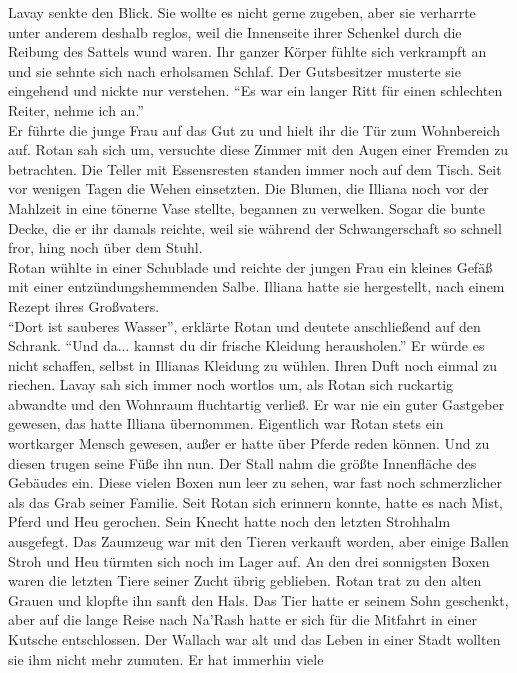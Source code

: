 Lavay senkte den Blick. Sie wollte es nicht gerne zugeben, aber sie verharrte unter anderem deshalb 
reglos, weil die Innenseite ihrer Schenkel durch die Reibung des Sattels wund waren. Ihr ganzer 
Körper fühlte sich verkrampft an und sie sehnte sich nach erholsamen Schlaf. Der Gutsbesitzer 
musterte sie eingehend und nickte nur verstehen. ``Es war ein langer Ritt für einen schlechten 
Reiter, nehme ich an.''\\
Er führte die junge Frau auf das Gut zu und hielt ihr die Tür zum Wohnbereich auf. Rotan sah sich 
um, versuchte diese Zimmer mit den Augen einer Fremden zu betrachten. Die Teller mit Essensresten 
standen immer noch auf dem Tisch. Seit vor wenigen Tagen die Wehen einsetzten. Die Blumen, die 
Illiana noch vor der Mahlzeit in eine tönerne Vase stellte, begannen zu verwelken. Sogar die bunte 
Decke, die er ihr damals reichte, weil sie während der Schwangerschaft so schnell fror, hing noch 
über dem Stuhl.\\
Rotan wühlte in einer Schublade und reichte der jungen Frau ein kleines Gefäß mit einer 
entzündungshemmenden Salbe. Illiana hatte sie hergestellt, nach einem Rezept ihres Großvaters.\\
``Dort ist sauberes Wasser'', erklärte Rotan und deutete anschließend auf den Schrank. ``Und da... 
kannst du dir frische Kleidung herausholen.'' Er würde es nicht schaffen, selbst in Illianas 
Kleidung zu wühlen. Ihren Duft noch einmal zu riechen. Lavay sah sich immer noch wortlos um, als 
Rotan sich ruckartig abwandte und den Wohnraum fluchtartig verließ. Er war nie ein guter Gastgeber 
gewesen, das hatte Illiana übernommen. Eigentlich war Rotan stets ein wortkarger Mensch gewesen, 
außer er hatte über Pferde reden können. Und zu diesen trugen seine Füße ihn nun. Der Stall nahm 
die größte Innenfläche des Gebäudes ein. Diese vielen Boxen nun leer zu sehen, war fast noch 
schmerzlicher als das Grab seiner Familie. Seit Rotan sich erinnern konnte, hatte es nach Mist, 
Pferd und Heu gerochen. Sein Knecht hatte noch den letzten Strohhalm ausgefegt. Das Zaumzeug war 
mit den Tieren verkauft worden, aber einige Ballen Stroh und Heu türmten sich noch im Lager auf. An 
den drei sonnigsten Boxen waren die letzten Tiere seiner Zucht übrig geblieben. Rotan trat zu den 
alten Grauen und klopfte ihn sanft den Hals. Das Tier hatte er seinem Sohn geschenkt, aber auf die 
lange Reise nach Na'Rash hatte er sich für die Mitfahrt in einer Kutsche entschlossen. Der Wallach 
war alt und das Leben in einer Stadt wollten sie ihm nicht mehr zumuten. Er hat immerhin viele 
